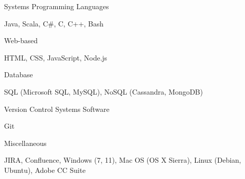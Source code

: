 \begin{cventries}
  \cventry
    {Systems}
    {Programming Languages}
    { }
    { }
    {
      \begin{cvitems}
        \item {Java, Scala, C\#, C, C++, Bash}
      \end{cvitems}
    }
  \cventry
    {Web-based}
    { }
    { }
    { }
    {
      \begin{cvitems}
        \item {HTML, CSS, JavaScript, Node.js}
      \end{cvitems}
    }
  \cventry
    {Database}
    { }
    { }
    { }
    {
      \begin{cvitems}
        \item {SQL (Microsoft SQL, MySQL), NoSQL (Cassandra, MongoDB)}
      \end{cvitems}
    }
  \cventry
    {Version Control Systems}
    {Software}
    { }
    { }
    {
      \begin{cvitems}
        \item {Git}
      \end{cvitems}
    }
  \cventry
    {Miscellaneous}
    { }
    { }
    { }
    {
      \begin{cvitems}
        \item {JIRA, Confluence, Windows (7, 11), Mac OS (OS X Sierra), Linux (Debian, Ubuntu), Adobe CC Suite}
      \end{cvitems}
    }
\end{cventries}